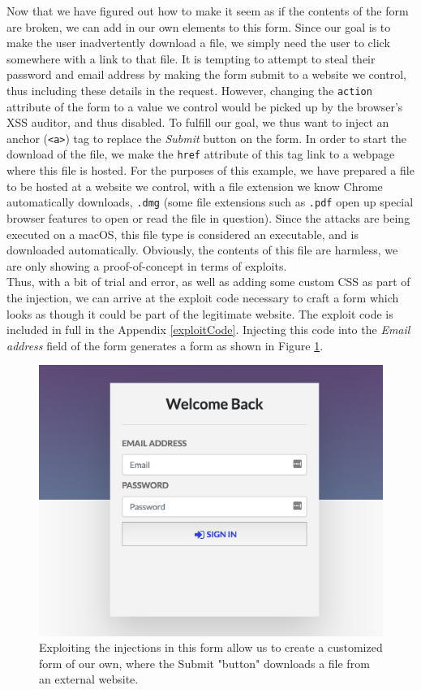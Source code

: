 Now that we have figured out how to make it seem as if the contents of the form are broken, we can add in our own elements to this form. Since our goal is to make the user inadvertently download a file, we simply need the user to click somewhere with a link to that file. It is tempting to attempt to steal their password and email address by making the form submit to a website we control, thus including these details in the request. However, changing the \texttt{action} attribute of the form to a value we control would be picked up by the browser's XSS auditor, and thus disabled. To fulfill our goal, we thus want to inject an anchor (\texttt{<a>}) tag to replace the \textit{Submit} button on the form. In order to start the download of the file, we make the \texttt{href} attribute of this tag link to a webpage where this file is hosted. For the purposes of this example, we have prepared a file to be hosted at a website we control, with a file extension we know Chrome automatically downloads, \texttt{.dmg} (some file extensions such as \texttt{.pdf} open up special browser features to open or read the file in question). Since the attacks are being executed on a macOS, this file type is considered an executable, and is downloaded automatically. Obviously, the contents of this file are harmless, we are only showing a proof-of-concept in terms of exploits. \\

Thus, with a bit of trial and error, as well as adding some custom CSS as part of the injection, we can arrive at the exploit code necessary to craft a form which looks as though it could be part of the legitimate website. The exploit code is included in full in the Appendix \ref{exploitCode}. Injecting this code into the \textit{Email address} field of the form generates a form as shown in Figure \ref{fig:fake_form_anon}. \\

\begin{figure}[h!]
	\centering
	\includegraphics[width=0.8\linewidth]{images/test_case_1/fake_form_anon_cropped.png}
	\caption{Exploiting the injections in this form allow us to create a customized form of our own, where the Submit "button" downloads a file from an external website.}
	\label{fig:fake_form_anon}
\end{figure} 


